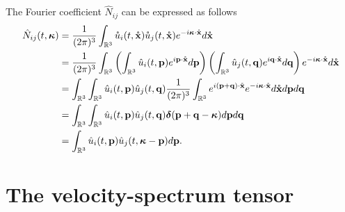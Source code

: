 \documentclass[oneside,a4paper,11pt]{report}
\newcommand{\kappavec}{\boldsymbol{\kappa}}
\begin{document}
The Fourier coefficient $\hat{N}_{ij}$ can be expressed as follows
\begin{align}
\hat{N}_{ij}(t,\kappavec) &= \frac{1}{(2\pi)^3} \int_\Rthree \urog_i(t,\xrogvec) \urog_j(t,\xrogvec) e^{-i \kappavec \cdot \xrogvec} d\xrogvec \nonumber \\
&= \frac{1}{(2\pi)^3} \int_\Rthree \left ( \int_\Rthree \hat{u}_i(t,\pvec) e^{i \pvec \cdot \xrogvec} d\pvec \right ) \left ( \int_\Rthree \hat{u}_j(t,\qvec) e^{i\qvec \cdot \xrogvec} d \qvec \right ) e^{-i \kappavec \cdot \xrogvec} d\xrogvec \nonumber \\
&= \int_\Rthree \int_\Rthree \hat{u}_i(t,\pvec) \hat{u}_j(t,\qvec) \frac{1}{(2\pi)^3} \int_\Rthree e^{i (\pvec + \qvec) \cdot \xrogvec} e^{-i \kappavec \cdot \xrogvec} d\xrogvec d\pvec d\qvec \nonumber \\
&=  \int_\Rthree \int_\Rthree \hat{u}_i(t,\pvec) \hat{u}_j(t,\qvec) \boldsymbol{\delta}(\pvec + \qvec - \kappavec)  d\pvec d\qvec \nonumber \\
&= \int_\Rthree \hat{u}_i(t,\pvec) \hat{u}_j(t,\kappavec - \pvec) d\pvec.
\end{align}

\section{The velocity-spectrum tensor}
\end{document}
